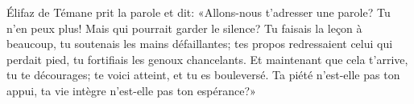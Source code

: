 Élifaz de Témane prit la parole et dit:
	«Allons-nous t’adresser une parole?
	Tu n’en peux plus! Mais qui pourrait garder le silence?
Tu faisais la leçon à beaucoup, tu soutenais les mains défaillantes;
	tes propos redressaient celui qui perdait pied,
	tu fortifiais les genoux chancelants.
Et maintenant que cela t’arrive, tu te décourages;
	te voici atteint, et tu es bouleversé.
Ta piété n’est-elle pas ton appui, ta vie intègre n’est-elle pas ton espérance?»
